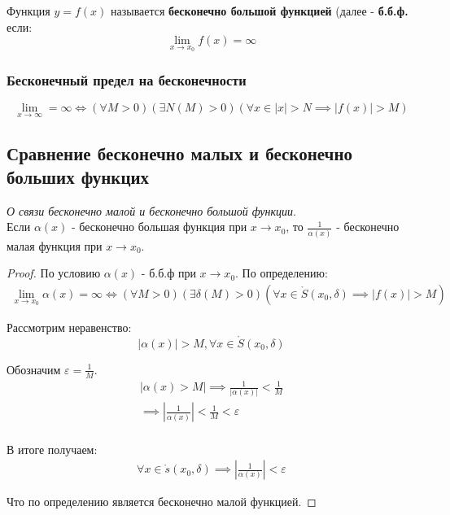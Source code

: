 \begin{definition}
  Функция $y = f(x)$ называется \textbf{бесконечно большой функцией} (далее - \textbf{б.б.ф.} если: \[
  \lim_{x \to x_0} f(x) = \infty
  \] 
\end{definition}

\subsubsection*{Бесконечный предел на бесконечности}
\[
  \lim_{x \to \infty} = \infty \iff (\forall M > 0)(\exists N(M) > 0)(\forall x \in |x| > N \implies |f(x)| > M) 
\] 
\subsection{Сравнение бесконечно малых и бесконечно больших функцих}

\begin{theorem}
  \textit{О связи бесконечно малой и бесконечно большой функции}. \\
  Если $\alpha(x)$ - бесконечно большая функция при $x \to x_0$, то $\frac{1}{\alpha(x)}$ - бесконечно малая функция при $x \to x_0$.
\end{theorem}
\begin{proof}
  По условию $\alpha(x)$ - б.б.ф при $x \to x_0$. По определению:
  \begin{gather*}
    \lim_{x \to x_0} \alpha(x) = \infty \iff (\forall M > 0)(\exists \delta(M) > 0)(\forall x \in \mathring{S}(x_0, \delta) \implies |f(x)| > M)
  \end{gather*}

  Рассмотрим неравенство: \[
    |\alpha(x)| > M, \forall x \in \mathring{S}(x_0, \delta)
  \]

  Обозначим $\varepsilon = \frac{1}{M}$.
  \begin{gather*}
    |\alpha(x) > M| \implies \frac{1}{|\alpha(x)|} < \frac{1}{M} \\
    \implies |\frac{1}{\alpha(x)}| < \frac{1}{M} < \varepsilon \\
  \end{gather*}

  В итоге получаем:
  \begin{gather*}
    \forall x \in \mathring{s}(x_0, \delta) \implies |\frac{1}{\alpha(x)}| < \varepsilon 
  \end{gather*}

  Что по определению является бесконечно малой функцией.
\end{proof}


